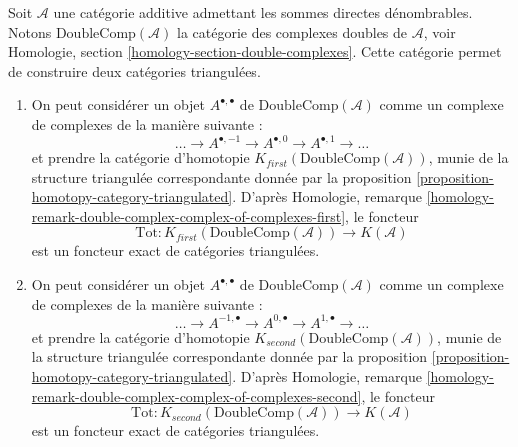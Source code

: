 \begin{remark}
\label{remark-homotopy-double}
Soit $\mathcal{A}$ une catégorie additive admettant les sommes directes
dénombrables. Notons $\text{DoubleComp}(\mathcal{A})$ la catégorie des
complexes doubles de $\mathcal{A}$, voir Homologie, section
\ref{homology-section-double-complexes}. Cette catégorie permet de construire
deux catégories triangulées.
\begin{enumerate}
\item On peut considérer un objet $A^{\bullet, \bullet}$ de
$\text{DoubleComp}(\mathcal{A})$ comme un complexe de complexes de la manière
suivante :
$$
\ldots \to A^{\bullet, -1} \to A^{\bullet, 0} \to A^{\bullet, 1} \to \ldots
$$
et prendre la catégorie d'homotopie
$K_{first}(\text{DoubleComp}(\mathcal{A}))$, munie de la structure triangulée
correspondante donnée par la
proposition \ref{proposition-homotopy-category-triangulated}.
D'après Homologie, remarque
\ref{homology-remark-double-complex-complex-of-complexes-first}, le foncteur
$$
\text{Tot} :
K_{first}(\text{DoubleComp}(\mathcal{A}))
\longrightarrow
K(\mathcal{A})
$$
est un foncteur exact de catégories triangulées.
\item On peut considérer un objet $A^{\bullet, \bullet}$ de
$\text{DoubleComp}(\mathcal{A})$ comme un complexe de complexes de la manière
suivante :
$$
\ldots \to A^{-1, \bullet} \to A^{0, \bullet} \to A^{1, \bullet} \to \ldots
$$
et prendre la catégorie d'homotopie
$K_{second}(\text{DoubleComp}(\mathcal{A}))$, munie de la structure triangulée
correspondante donnée par la
proposition \ref{proposition-homotopy-category-triangulated}.
D'après Homologie, remarque
\ref{homology-remark-double-complex-complex-of-complexes-second}, le foncteur
$$
\text{Tot} :
K_{second}(\text{DoubleComp}(\mathcal{A}))
\longrightarrow
K(\mathcal{A})
$$
est un foncteur exact de catégories triangulées.
\end{enumerate}
\end{remark}

